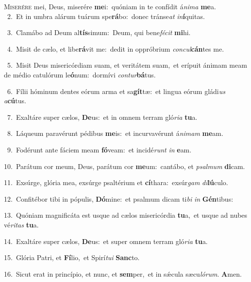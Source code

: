 \lettrine{\initial\textcolor{\initialcolor}{M}}{iserére} mei, Deus, miserére \textbf{me}\-i:~\star quóniam in te confídit á\-\textit{ni}\-\textit{ma} \textbf{me}\-a.\\
{\numbfont\textcolor{\numbcolor}{~2.}}~Et in umbra alárum tuárum spe\-\textbf{rá}\-bo:~\star donec tránse\textit{at} \textit{in}\-\textbf{í}quitas.\par
{\numbfont\textcolor{\numbcolor}{~3.}}~Clamábo ad Deum al\-\textbf{tís}\-simum:~\star Deum, qui bene\-\textit{fé}\-\textit{cit} \textbf{mi}\-hi.\par
{\numbfont\textcolor{\numbcolor}{~4.}}~Misit de cælo, et libe\-\textbf{rá}\-vit me:~\star dedit in oppróbrium \textit{con}\-\textit{cul}\textbf{cán}tes me.\par
{\numbfont\textcolor{\numbcolor}{~5.}}~Misit Deus misericórdiam suam, et veritátem suam,~\dagger et erípuit ánimam meam de médio catulórum le\-\textbf{ó}\-num:~\star dormívi \textit{con}\-\textit{tur}\textbf{bá}tus.\par
{\numbfont\textcolor{\numbcolor}{~6.}}~Fílii hóminum dentes eórum arma et sa\-\textbf{gít}\-tæ:~\star et lingua eórum gládi\textit{us} \textit{a}\-\textbf{cú}tus.\par
{\numbfont\textcolor{\numbcolor}{~7.}}~Exaltáre super cælos, \textbf{De}\-us:~\star et in omnem terram gló\-\textit{ri}\-\textit{a} \textbf{tu}\-a.\par
{\numbfont\textcolor{\numbcolor}{~8.}}~Láqueum paravérunt pédibus \textbf{me}\-is:~\star et incurvavérunt á\-\textit{ni}\-\textit{mam} \textbf{me}\-am.\par
{\numbfont\textcolor{\numbcolor}{~9.}}~Fodérunt ante fáciem meam \textbf{fó}\-veam:~\star et incidé\textit{runt} \textit{in} \textbf{e}\-am.\par
{\numbfont\textcolor{\numbcolor}{10.}}~Parátum cor meum, Deus, parátum cor \textbf{me}\-um:~\star cantábo, et \textit{psal}\-\textit{mum} \textbf{di}\-cam.\par
{\numbfont\textcolor{\numbcolor}{11.}}~Exsúrge, glória mea, exsúrge psaltérium et \textbf{cí}\-thara:~\star exsúr\textit{gam} \textit{di}\-\textbf{lú}culo.\par
{\numbfont\textcolor{\numbcolor}{12.}}~Confitébor tibi in pópulis, \textbf{Dó}\-mine:~\star et psalmum dicam ti\textit{bi} \textit{in} \textbf{Gén}\-tibus:\par
{\numbfont\textcolor{\numbcolor}{13.}}~Quóniam magnificáta est usque ad cælos misericórdia \textbf{tu}\-a,~\star et usque ad nubes vé\-\textit{ri}\-\textit{tas} \textbf{tu}\-a.\par
{\numbfont\textcolor{\numbcolor}{14.}}~Exaltáre super cælos, \textbf{De}\-us:~\star et super omnem terram gló\-\textit{ri}\-\textit{a} \textbf{tu}\-a.\par
{\numbfont\textcolor{\numbcolor}{15.}}~Glória Patri, et \textbf{Fí}\-lio,~\star et Spirí\-\textit{tu}\-\textit{i} \textbf{Sanc}\-to.\par
{\numbfont\textcolor{\numbcolor}{16.}}~Sicut erat in princípio, et nunc, et \textbf{sem}\-per,~\star et in sǽcula sæcu\-\textit{ló}\-\textit{rum}. \textbf{A}\-men.\par
